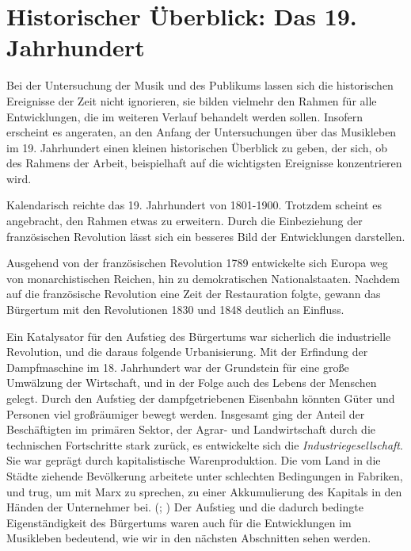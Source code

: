 \documentclass[a4paper, german, oneside]{scrbook}
\begin{document}
\section{Historischer Überblick: Das 19. Jahrhundert}
\label{histUberblick}
Bei der Untersuchung der Musik und des Publikums lassen sich die historischen Ereignisse der Zeit nicht ignorieren, sie bilden vielmehr den Rahmen für alle Entwicklungen, die im weiteren Verlauf behandelt werden sollen. Insofern erscheint es angeraten, an den Anfang der Untersuchungen über das Musikleben im 19. Jahrhundert einen kleinen historischen Überblick zu geben, der sich, ob des Rahmens der Arbeit, beispielhaft auf die wichtigsten Ereignisse konzentrieren wird.

Kalendarisch reichte das 19. Jahrhundert von 1801-1900. Trotzdem scheint es angebracht, den Rahmen etwas zu erweitern. Durch die Einbeziehung der französischen Revolution lässt sich ein besseres Bild der Entwicklungen darstellen.

Ausgehend von der französischen Revolution 1789 entwickelte sich Europa weg von monarchistischen Reichen, hin zu demokratischen Nationalstaaten. Nachdem auf die französische Revolution eine Zeit der Restauration folgte, gewann das Bürgertum mit den Revolutionen 1830 und 1848 deutlich an Einfluss. \parencite[vgl.][253ff.]{demandt_kleine_2003}

Ein Katalysator für den Aufstieg des Bürgertums war sicherlich die industrielle Revolution, und die daraus folgende Urbanisierung. Mit der Erfindung der Dampfmaschine im 18. Jahrhundert war der Grundstein für eine große Umwälzung der Wirtschaft, und in der Folge auch des Lebens der Menschen gelegt. Durch den Aufstieg der dampfgetriebenen Eisenbahn könnten Güter und Personen viel großräumiger bewegt werden. Insgesamt ging der Anteil der Beschäftigten im primären Sektor, der Agrar- und Landwirtschaft durch die technischen Fortschritte stark zurück, es entwickelte sich die \emph{Industriegesellschaft}. Sie war geprägt durch kapitalistische Warenproduktion. Die vom Land in die Städte ziehende Bevölkerung arbeitete unter schlechten Bedingungen in Fabriken, und trug, um mit Marx zu sprechen, zu einer Akkumulierung des Kapitals in den Händen der Unternehmer bei. (\cite{marx_kapital:_1989}; \cite[368]{hillmann_worterbuch_2007}) Der Aufstieg und die dadurch bedingte Eigenständigkeit des Bürgertums waren auch für die Entwicklungen im Musikleben bedeutend, wie wir in den nächsten Abschnitten sehen werden.
\end{document}
